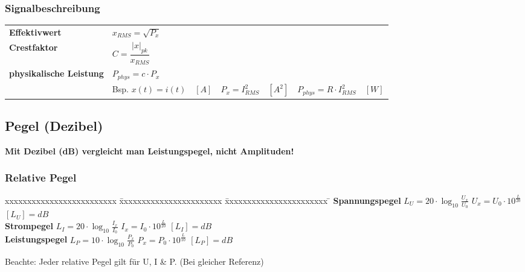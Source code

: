 		\subsubsection{Signalbeschreibung}
			\begin{tabular}{p{4cm} p{4cm} p{4cm} p{4cm}}
				\textbf{Effektivwert} & 
				$x_{RMS} = \sqrt{P_x}$\\
				\textbf{Crestfaktor} & 
				$C = \dfrac{|x|_{pk}}{x_{RMS}}$\\
				\textbf{physikalische Leistung} &
				$P_{phys} = c \cdot P_x$\\
				& Bsp. $x(t) = i(t) \quad [A]$&
				$P_x = I_{RMS}^2 \quad [A^2]$&
				$P_{phys} = R \cdot I_{RMS}^2 \quad [W]$
			\end{tabular}
			 
			

	\subsection{Pegel (Dezibel)}
		\textbf{Mit Dezibel (dB) vergleicht man Leistungspegel, nicht Amplituden!}

	\subsubsection{Relative Pegel}
		\begin{tabbing}
			xxxxxxxxxxxxxxxxxxxxxxxxx \= xxxxxxxxxxxxxxxxxxxxxxx  \= xxxxxxxxxxxxxxxxxxxxxxx \=\kill
			\textbf{Spannungspegel} \> $L_U = 20 \cdot \log_{10} \frac{U_x}{U_0}$ \> $U_x = U_0 \cdot
			10^{\frac{L}{20}} $ \> $[L_U] = dB$ \\ 
			
			\textbf{Strompegel} \> $L_I  = 20 \cdot \log_{10} \frac{I_x}{I_0}$ \> $I_x = I_0 \cdot
			10^{\frac{L}{20}} $ \> $[L_I] = dB$ \\ 
			
			\textbf{Leistungspegel} \> $L_P = 10 \cdot \log_{10} \frac{P_x}{P_0}$ \> $P_x = P_0 \cdot
			10^{\frac{L}{10}} $ \> $[L_P] = dB$
		\end{tabbing}
		Beachte: Jeder relative Pegel gilt für U, I \& P. (Bei gleicher Referenz)
	

